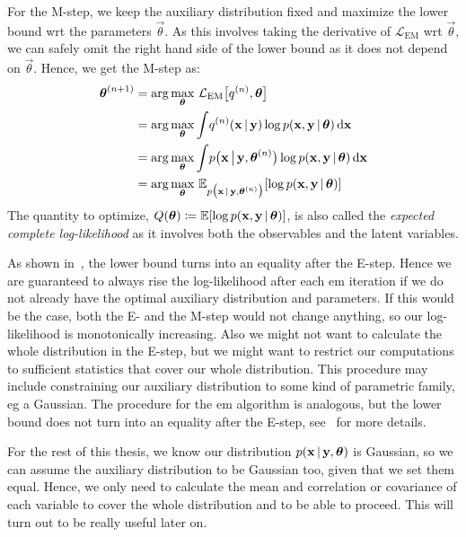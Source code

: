 		For the M-step, we keep the auxiliary distribution fixed and maximize the lower bound \ac{wrt} the parameters \(\vec{\theta}\). As this involves taking the derivative of \(\mathcal{L}_\mathrm{EM}\) \ac{wrt} \(\vec{\theta}\), we can safely omit the right hand side of the lower bound as it does not depend on \(\vec{\theta}\). Hence, we get the M-step as:
		\begin{align*}
			\boldsymbol{\mathrm{\theta}}^{(n + 1)}
				&= \arg\max_{\boldsymbol{\mathrm{\theta}}}\, \mathcal{L}_\mathrm{EM}\big[ q^{(n)}, \boldsymbol{\mathrm{\theta}} \big] \\
				&= \arg\max_{\boldsymbol{\mathrm{\theta}}} \int\! q^{(n)}(\boldsymbol{\mathrm{x}} \,\vert\, \boldsymbol{\mathrm{y}}) \log p(\boldsymbol{\mathrm{x}}, \boldsymbol{\mathrm{y}} \,\vert\, \boldsymbol{\mathrm{\theta}}) \dd{\boldsymbol{\mathrm{x}}} \\
				&= \arg\max_{\boldsymbol{\mathrm{\theta}}} \int\! p\big(\boldsymbol{\mathrm{x}} \,\big\vert\, \boldsymbol{\mathrm{y}}, \boldsymbol{\mathrm{\theta}}^{(n)}\big) \log p(\boldsymbol{\mathrm{x}}, \boldsymbol{\mathrm{y}} \,\vert\, \boldsymbol{\mathrm{\theta}}) \dd{\boldsymbol{\mathrm{x}}} \\
				&= \arg\max_{\boldsymbol{\mathrm{\theta}}}\, \mathbb{E}_{p\big(\boldsymbol{\mathrm{x}} \,\vert\, \boldsymbol{\mathrm{y}}, \boldsymbol{\mathrm{\theta}}^{(n)}\big)}[\log p(\boldsymbol{\mathrm{x}}, \boldsymbol{\mathrm{y}} \,\vert\, \boldsymbol{\mathrm{\theta}})]
		\end{align*}
		The quantity to optimize, \( Q(\boldsymbol{\mathrm{\theta}}) \coloneqq \mathbb{E}[\log p(\boldsymbol{\mathrm{x}}, \boldsymbol{\mathrm{y}} \,\vert\, \boldsymbol{\mathrm{\theta}})] \), is also called the \emph{expected complete log-likelihood} as it involves both the observables and the latent variables.

		As shown in~\cite{bealVariationalAlgorithmsApproximate2003}, the lower bound turns into an equality after the E-step. Hence we are guaranteed to always rise the log-likelihood after each \ac{em} iteration if we do not already have the optimal auxiliary distribution and parameters. If this would be the case, both the E- and the M-step would not change anything, so our log-likelihood is monotonically increasing. Also we might not want to calculate the whole distribution in the E-step, but we might want to restrict our computations to sufficient statistics that cover our whole distribution. This procedure may include constraining our auxiliary distribution to some kind of parametric family, \ac{eg} a Gaussian. The procedure for the \ac{em} algorithm is analogous, but the lower bound does not turn into an equality after the E-step, see~\cite[49-51]{bealVariationalAlgorithmsApproximate2003} for more details.

		For the rest of this thesis, we know our distribution \( p(\boldsymbol{\mathrm{x}} \,\vert\, \boldsymbol{\mathrm{y}}, \boldsymbol{\mathrm{\theta}}) \) is Gaussian, so we can assume the auxiliary distribution to be Gaussian too, given that we set them equal. Hence, we only need to calculate the mean and correlation or covariance of each variable to cover the whole distribution and to be able to proceed. This will turn out to be really useful later on.

